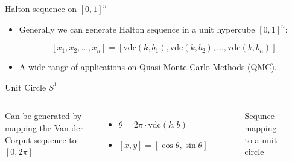 \documentclass[10pt,ignorenonframetext,serif,onlymath]{beamer}
\begin{document}
\begin{frame}{Halton sequence on \([0,1]^n\)}
\protect\hypertarget{halton-sequence-on-01n}{}

\begin{itemize}
\item
  Generally we can generate Halton sequence in a unit hypercube
  \([0,1]^n\):

  \[[x_1, x_2, \ldots, x_n] = [\mathrm{vdc}(k,b_1), \mathrm{vdc}(k,b_2), \ldots, \mathrm{vdc}(k,b_n)]\]
\item
  A wide range of applications on Quasi-Monte Carlo Methods (QMC).
\end{itemize}

\end{frame}

\begin{frame}{Unit Circle \(S^1\)}
\protect\hypertarget{unit-circle-s1}{}

\begin{columns}


Can be generated by mapping the Van der Corput sequence to \([0, 2\pi]\)

\begin{itemize}
\item
  \(\theta = 2\pi \cdot \mathrm{vdc}(k,b)\)
\item
  \([x, y] = [\cos\theta, \sin\theta]\)
\end{itemize}


\begin{figure}[hp]
\centering

\caption{Sequnce mapping to a unit circle}%
\label{fig:circle}
\end{figure}

\end{columns}

\end{frame}
\end{document}
